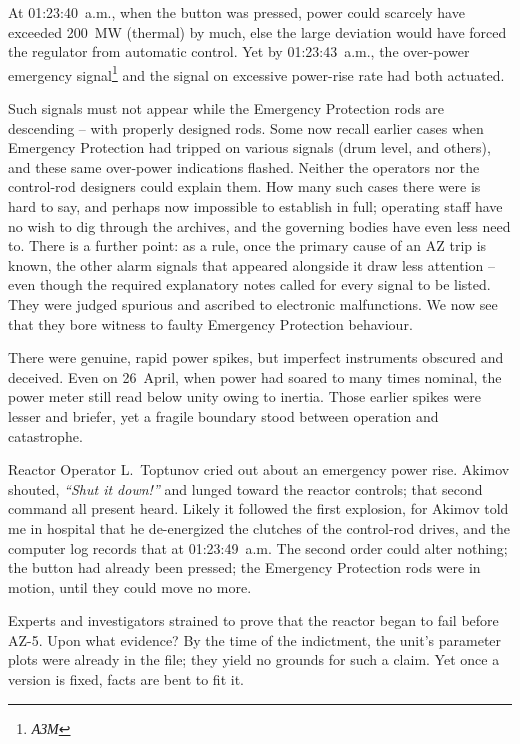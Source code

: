 \documentclass[openright]{bookest}
\begin{document}
At 01:23:40~a.m., when the button was pressed, power could scarcely have exceeded \qty{200}{\mega\watt} (thermal) by much, else the large deviation would have forced the regulator from automatic control. Yet by 01:23:43~a.m., the over-power emergency signal\footnote{\textit{АЗМ}} and the signal on excessive power-rise rate had both actuated.

Such signals must not appear while the Emergency Protection rods are descending -- with properly designed rods. Some now recall earlier cases when Emergency Protection had tripped on various signals (drum level, and others), and these same over-power indications flashed. Neither the operators nor the control-rod designers could explain them. How many such cases there were is hard to say, and perhaps now impossible to establish in full; operating staff have no wish to dig through the archives, and the governing bodies have even less need to. There is a further point: as a rule, once the primary cause of an AZ trip is known, the other alarm signals that appeared alongside it draw less attention -- even though the required explanatory notes called for every signal to be listed. They were judged spurious and ascribed to electronic malfunctions. We now see that they bore witness to faulty Emergency Protection behaviour.

There were genuine, rapid power spikes, but imperfect instruments obscured and deceived. Even on 26~April, when power had soared to many times nominal, the power meter still read below unity owing to inertia. Those earlier spikes were lesser and briefer, yet a fragile boundary stood between operation and catastrophe.

Reactor Operator L.~Toptunov cried out about an emergency power rise. Akimov shouted, \textit{``Shut it down!''} and lunged toward the reactor controls; that second command all present heard. Likely it followed the first explosion, for Akimov told me in hospital that he de-energized the clutches of the control-rod drives, and the computer log records that at 01:23:49~a.m. The second order could alter nothing; the button had already been pressed; the Emergency Protection rods were in motion, until they could move no more.

Experts and investigators strained to prove that the reactor began to fail before AZ-5. Upon what evidence? By the time of the indictment, the unit's parameter plots were already in the file; they yield no grounds for such a claim. Yet once a version is fixed, facts are bent to fit it.
\end{document}
